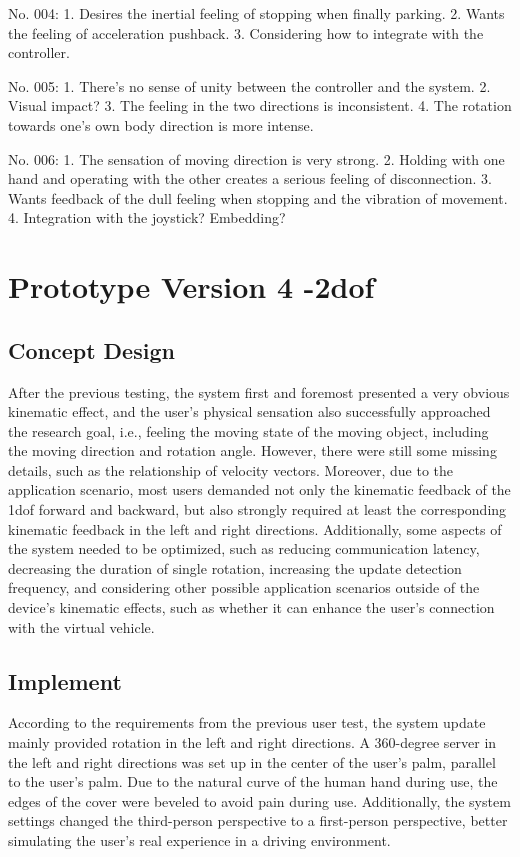 No. 004:    1. Desires the inertial feeling of stopping when finally parking.
2. Wants the feeling of acceleration pushback.
3. Considering how to integrate with the controller.

No. 005:    1. There's no sense of unity between the controller and the system.
2. Visual impact?
3. The feeling in the two directions is inconsistent.
4. The rotation towards one's own body direction is more intense.

No. 006:    1. The sensation of moving direction is very strong.
2. Holding with one hand and operating with the other creates a serious feeling of disconnection.
3. Wants feedback of the dull feeling when stopping and the vibration of movement.
4. Integration with the joystick? Embedding?

\section{Prototype Version 4 -2dof}
\subsection{Concept Design}
After the previous testing, the system first and foremost presented a very obvious kinematic effect, and the user's physical sensation also successfully approached the research goal, i.e., feeling the moving state of the moving object, including the moving direction and rotation angle. However, there were still some missing details, such as the relationship of velocity vectors. Moreover, due to the application scenario, most users demanded not only the kinematic feedback of the 1dof forward and backward, but also strongly required at least the corresponding kinematic feedback in the left and right directions. Additionally, some aspects of the system needed to be optimized, such as reducing communication latency, decreasing the duration of single rotation, increasing the update detection frequency, and considering other possible application scenarios outside of the device's kinematic effects, such as whether it can enhance the user's connection with the virtual vehicle.

\subsection{Implement}
According to the requirements from the previous user test, the system update mainly provided rotation in the left and right directions. A 360-degree server in the left and right directions was set up in the center of the user's palm, parallel to the user's palm. Due to the natural curve of the human hand during use, the edges of the cover were beveled to avoid pain during use.
Additionally, the system settings changed the third-person perspective to a first-person perspective, better simulating the user's real experience in a driving environment. 

